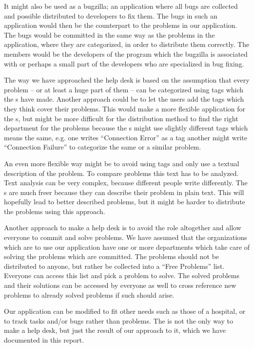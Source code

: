 It might also be used as a bugzilla; an application where all bugs are collected and possible distributed to developers to fix them.
The bugs in such an application would then be the counterpart to the problems in our application.
The bugs would be committed in the same way as the problems in the \hdesk[] application, where they are categorized, in order to distribute them correctly.
The \astaff[] members would be the developers of the program which the bugzilla is associated with or perhaps a small part of the developers who are specialized in bug fixing.

The way we have approached the help desk is based on the assumption that every problem -- or at least a huge part of them -- can be categorized using tags which the \admin[]s have made.
Another approach could be to let the users add the tags which they think cover their problems.
This would make a more flexible application for the \aclient[]s, but might be more difficult for the distribution method to find the right department for the problems because the \aclient[]s might use slightly different tags which means the same, e.g. one \aclient[] writes ``Connection Error'' as a tag another might write ``Connection Failure'' to categorize the same or a similar problem.

An even more flexible way might be to avoid using tags and only use a textual description of the problem.
To compare problems this text has to be analyzed.
Text analysis can be very complex, because different people write differently.
The \aclient[]s are much freer because they can describe their problem in plain text.
This will hopefully lead to better described problems, but it might be harder to distribute the problems using this approach.

Another approach to make a help desk is to avoid the \astaff[] role altogether and allow everyone to commit and solve problems.
We have assumed that the organizations which are to use our application have one or more departments which take care of solving the problems which are committed. The problems should not be distributed to anyone, but rather be collected into a ``Free Problems'' list.
Everyone can access this list and pick a problem to solve.
The solved problems and their solutions can be accessed by everyone as well to cross reference new problems to already solved problems if such should arise.


Our application can be modified to fit other needs such as those of a hospital, or to track tasks and/or bugs rather than problems.
The \hdesk[] is not the only way to make a help desk, but just the result of our approach to it, which we have documented in this report.

